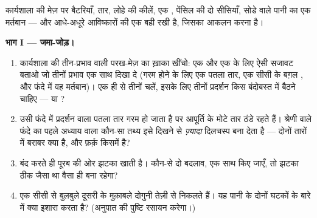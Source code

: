 \begin{problem}[{सप्ताहांत समस्या --- एक बैटरी, तीन प्रभाव, पाँच
आविष्कार; आविष्कारक की कार्यशाला में एक
शाम}]\label{pb:g8:electric-current-effects:1}
कार्यशाला की मेज़ पर बैटरियाँ, तार, लोहे की कीलें, एक ,
पेंसिल की दो सीसियाँ, सोडे वाले पानी का एक मर्तबान --- और आधे-अधूरे
आविष्कारों की एक बही रखी है, जिसका आकलन करना है।

\medskip\noindent\textbf{भाग I --- जमा-जोड़।}
\begin{enumerate}
  \item कार्यशाला की तीन-प्रभाव वाली परख-मेज़ का ख़ाका खींचो: एक
         और एक  के लिए ऐसी सजावट बताओ जो तीनों प्रभाव एक
        साथ दिखा दे (गरम होने के लिए एक पतला तार, एक सीसी के बग़ल
        , और फंदे में वह मर्तबान)। एक ही  से तीनों चलें,
        इसके लिए तीनों प्रदर्शन किस बंदोबस्त में बैठने चाहिए ---
         या ?
  \item उसी फंदे में प्रदर्शन वाला पतला तार गरम हो जाता है पर आपूर्ति
        के मोटे तार ठंडे रहते हैं। श्रेणी वाले फंदे का पहले अध्याय
        वाला कौन-सा तथ्य इसे दिखने से \emph{ज़्यादा} दिलचस्प बना देता
        है --- दोनों तारों में बराबर क्या है, और फ़र्क़ किसमें है?
  \item {} बंद करते ही  पूरब की ओर झटका खाती है। कौन-से दो
        बदलाव, एक साथ किए जाएँ, तो झटका ठीक जैसा था वैसा ही बना
        रहेगा?
  \item एक सीसी से बुलबुले दूसरी के मुक़ाबले दोगुनी तेज़ी से निकलते
        हैं। यह पानी के दोनों घटकों के बारे में क्या इशारा करता है?
        (अनुपात की पुष्टि रसायन करेगा।)
\end{enumerate}


\end{problem}
